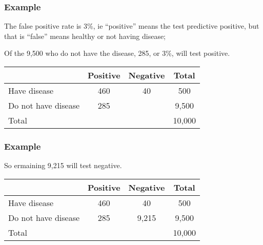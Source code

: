 \begin{frame}
\frametitle{Example}
The false positive rate is 3\%, ie ``positive'' means the test predictive positive, but that is ``false'' means healthy or not having disease; 

\vspace{.1in}
Of the 9,500 who do not have the disease, 285, or 3\%, will test positive.\\ 
\begin{center}
\begin{tabular}{|l|c|c|c|}
\hline
& Positive & Negative &Total\\
\hline
Have disease &460 &40&500\\
\hline
Do not have disease &285& &9,500\\
\hline
Total &&&10,000\\
\hline
\end{tabular}
\end{center}
\end{frame}

\begin{frame}
\frametitle{Example}

\vspace{.1in}
So ermaining 9,215 will test negative.\\ 
\begin{center}
\begin{tabular}{|l|c|c|c|}
\hline
& Positive & Negative &Total\\
\hline
Have disease &460 &40&500\\
\hline
Do not have disease &285&9,215 &9,500\\
\hline
Total &&&10,000\\
\hline
\end{tabular}
\end{center}
\end{frame}

